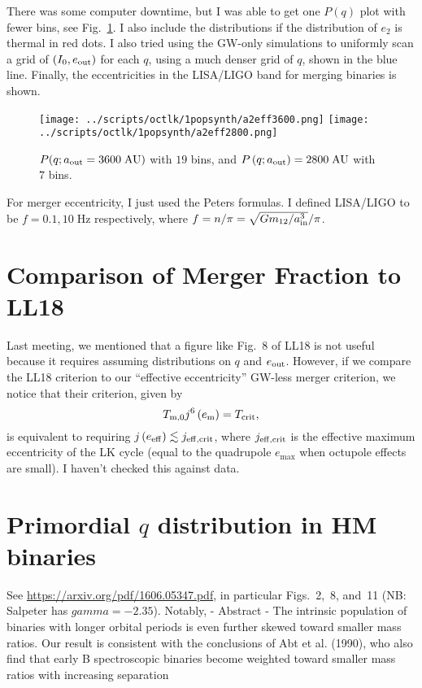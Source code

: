 \documentclass[11pt,
        usenames, %
        dvipsnames %
    ]{article}
\newcommand*{\p}[1]{\left(#1\right)}
\begin{document}
There was some computer downtime, but I was able to get one $P(q)$ plot with
fewer bins, see Fig.~\ref{fig:popsynths}. I also include the distributions if
the distribution of $e_2$ is thermal in red dots. I also tried using the GW-only
simulations to uniformly scan a grid of $(I_0, e_{\rm out})$ for each $q$, using
a much denser grid of $q$, shown in the blue line. Finally, the eccentricities
in the LISA/LIGO band for merging binaries is shown.
\begin{figure}
    \centering
    \texttt{[image: ../scripts/octlk/1popsynth/a2eff3600.png]}
    \texttt{[image: ../scripts/octlk/1popsynth/a2eff2800.png]}
    \caption{$P(q; a_{\rm out} = 3600\;\mathrm{AU})$ with $19$ bins, and $P\p{q;
    a_{\rm out}} = 2800\;\mathrm{AU}$ with $7$ bins.}\label{fig:popsynths}
\end{figure}

For merger eccentricity, I just used the Peters formulas. I defined LISA/LIGO to
be $f = 0.1, 10\;\mathrm{Hz}$ respectively, where $f = n / \pi = \sqrt{Gm_{12} /
a_{\rm in}^3} / \pi$.

\section{Comparison of Merger Fraction to LL18}

Last meeting, we mentioned that a figure like Fig.~8 of LL18 is not useful
because it requires assuming distributions on $q$ and $e_{\rm out}$. However, if
we compare the LL18 criterion to our ``effective eccentricity'' GW-less merger
criterion, we notice that their criterion, given by
\begin{equation}
    T_{\rm m, 0}j^6\p{e_{\rm m}} = T_{\rm crit},
\end{equation}
is equivalent to requiring $j\p{e_{\rm eff}} \lesssim j_{\rm eff, crit}$, where
$j_{\rm eff, crit}$ is the effective maximum eccentricity of the LK cycle (equal
to the quadrupole $e_{\max}$ when octupole effects are small). I haven't checked
this against data.

\section{Primordial $q$ distribution in HM binaries}


See \url{https://arxiv.org/pdf/1606.05347.pdf}, in particular Figs.~2,~8, and~11
(NB\@: Salpeter has $gamma = -2.35$). Notably,
- Abstract
- The intrinsic population of binaries with longer orbital periods is even
  further skewed toward smaller mass ratios. Our result is consistent with the
  conclusions of Abt et al. (1990), who also find that early B spectroscopic
  binaries become weighted toward smaller mass ratios with increasing separation
\end{document}
